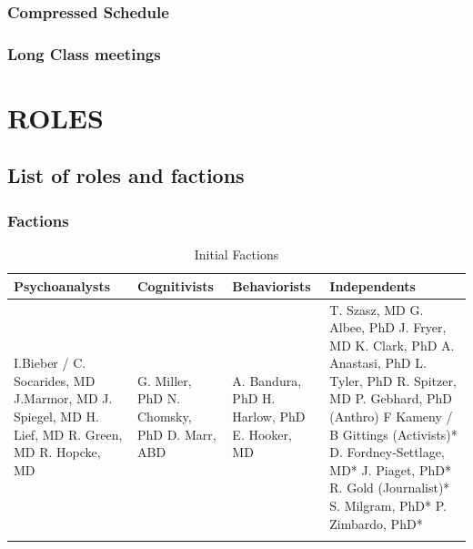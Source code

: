 \subsection{Compressed Schedule}
\label{compressedschedule}

\subsection{Long Class meetings}
\label{longclassmeetings}

\pagebreak 

\chapter{ROLES}
\label{roles}

\section{List of roles and factions}
\label{listofrolesandfactions}

\subsection{Factions}
\label{factions}

 \begin{longtable}[!t]{ | P{3cm} | P{3cm} | P{3cm} | P{3.5cm} | }
\hline
Psychoanalysts & Cognitivists & Behaviorists & Independents \\ \hline
I.Bieber / C. Socarides, MD \newline
J.Marmor, MD \newline
J. Spiegel, MD \newline
H. Lief, MD \newline
R. Green, MD \newline
R. Hopcke, MD &
G. Miller, PhD \newline
N. Chomsky, PhD \newline
D. Marr, ABD &
A. Bandura, PhD \newline
H. Harlow, PhD \newline
E. Hooker, MD \newline &
T. Szasz, MD\newline
G. Albee, PhD\newline
J. Fryer, MD\newline
K. Clark, PhD\newline
A. Anastasi, PhD\newline
L. Tyler, PhD\newline
R. Spitzer, MD\newline
P. Gebhard, PhD (Anthro)\newline
F Kameny / B Gittings (Activists)*\newline
D. Fordney-Settlage, MD*\newline
J. Piaget, PhD*\newline
R. Gold (Journalist)*\newline
S. Milgram, PhD*\newline
P. Zimbardo, PhD*\newline \\ \hline
\caption{Initial Factions}
\label{table: factions}
\end{longtable}


